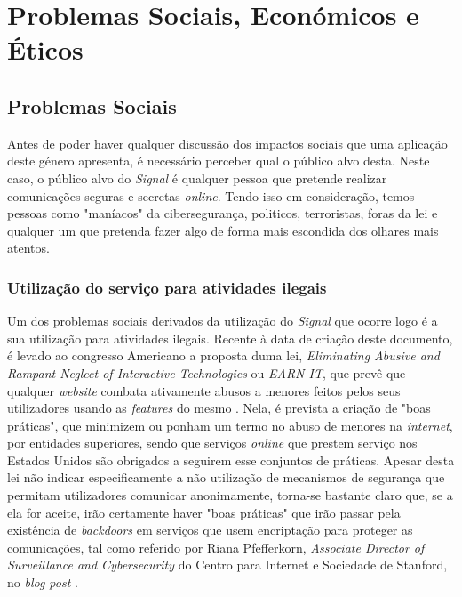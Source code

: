 \section{Problemas Sociais, Económicos e Éticos}

\subsection{Problemas Sociais}
Antes de poder haver qualquer discussão dos impactos sociais que uma aplicação deste género apresenta, é necessário perceber qual o público alvo desta. Neste caso, o público alvo do \textit{Signal} é qualquer pessoa que pretende realizar comunicações seguras e secretas \textit{online}. Tendo isso em consideração, temos pessoas como "maníacos" da cibersegurança, politicos, terroristas, foras da lei e qualquer um que pretenda fazer algo de forma mais escondida dos olhares mais atentos.

\subsubsection{Utilização do serviço para atividades ilegais}
Um dos problemas sociais derivados da utilização do \textit{Signal} que ocorre logo é a sua utilização para atividades ilegais. Recente à data de criação deste documento, é levado ao congresso Americano a proposta duma lei, \textit{Eliminating Abusive and Rampant Neglect of Interactive Technologies} ou \textit{EARN IT}, que prevê que qualquer \textit{website} combata ativamente abusos a menores feitos pelos seus utilizadores usando as \textit{features} do mesmo \cite{senate_earn_it}. Nela, é prevista a criação de "boas práticas", que minimizem ou ponham um termo no abuso de menores na \textit{internet}, por entidades superiores, sendo que serviços \textit{online} que prestem serviço nos Estados Unidos são obrigados a seguirem esse conjuntos de práticas. Apesar desta lei não indicar especificamente a não utilização de mecanismos de segurança que permitam utilizadores comunicar anonimamente, torna-se bastante claro que, se a ela for aceite, irão certamente haver "boas práticas" que irão passar pela existência de \textit{backdoors} em serviços que usem encriptação para proteger as comunicações, tal como referido por Riana Pfefferkorn, \textit{Associate Director of Surveillance and Cybersecurity} do Centro para Internet e Sociedade de Stanford, no \textit{blog post} \cite{stanford_cis}.

